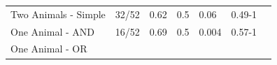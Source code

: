 \documentclass[oneside]{report}
\theoremstyle{definition}
\theoremstyle{definition}
\theoremstyle{definition}
\theoremstyle{remark}
\begin{document}
\begin{longtable}[]{@{}lllllll@{}}
\midrule
\endhead
\begin{minipage}[t]{0.24\columnwidth}\raggedright\strut
Two Animals - Simple\strut
\end{minipage} & \begin{minipage}[t]{0.07\columnwidth}\raggedright\strut
32/52\strut
\end{minipage} & \begin{minipage}[t]{0.07\columnwidth}\raggedright\strut
0.62\strut
\end{minipage} & \begin{minipage}[t]{0.06\columnwidth}\raggedright\strut
0.5\strut
\end{minipage} & \begin{minipage}[t]{0.06\columnwidth}\raggedright\strut
0.06\strut
\end{minipage} & \begin{minipage}[t]{0.08\columnwidth}\raggedright\strut
0.49-1\strut
\end{minipage} & \begin{minipage}[t]{0.08\columnwidth}\raggedright\strut
\strut
\end{minipage}\tabularnewline
\begin{minipage}[t]{0.24\columnwidth}\raggedright\strut
One Animal - AND\strut
\end{minipage} & \begin{minipage}[t]{0.07\columnwidth}\raggedright\strut
16/52\strut
\end{minipage} & \begin{minipage}[t]{0.07\columnwidth}\raggedright\strut
0.69\strut
\end{minipage} & \begin{minipage}[t]{0.06\columnwidth}\raggedright\strut
0.5\strut
\end{minipage} & \begin{minipage}[t]{0.06\columnwidth}\raggedright\strut
0.004\strut
\end{minipage} & \begin{minipage}[t]{0.08\columnwidth}\raggedright\strut
0.57-1\strut
\end{minipage} & \begin{minipage}[t]{0.08\columnwidth}\raggedright\strut
\strut
\end{minipage}\tabularnewline
\begin{minipage}[t]{0.24\columnwidth}\raggedright\strut
One Animal - OR\strut
\end{minipage} & \begin{minipage}[t]{0.07\columnwidth}\raggedright\strut

\end{minipage}
\end{longtable}
\end{document}

